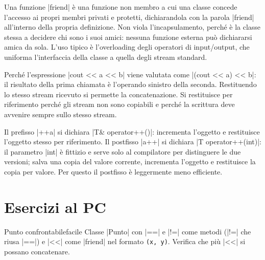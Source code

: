 \begin{orale}
Una funzione \cc|friend| è una funzione non membro a cui una classe concede l'accesso ai
propri membri privati e protetti, dichiarandola con la parola \cc|friend| all'interno
della propria definizione. Non viola l'incapsulamento, perché è la classe stessa a
decidere chi sono i suoi amici: nessuna funzione esterna può dichiararsi amica da sola.
L'uso tipico è l'overloading degli operatori di input/output, che uniforma l'interfaccia
della classe a quella degli stream standard.
\end{orale}

\begin{orale}
Perché l'espressione \cc|cout << a << b| viene valutata come \cc|(cout << a) << b|: il
risultato della prima chiamata è l'operando sinistro della seconda. Restituendo lo stesso
stream ricevuto si permette la concatenazione. Si restituisce per riferimento perché gli
stream non sono copiabili e perché la scrittura deve avvenire sempre sullo stesso stream.
\end{orale}

\begin{orale}
Il prefisso \cc|++a| si dichiara \cc|T& operator++()|: incrementa l'oggetto e restituisce
l'oggetto stesso per riferimento. Il postfisso \cc|a++| si dichiara
\cc|T operator++(int)|: il parametro \cc|int| è fittizio e serve solo al compilatore per
distinguere le due versioni; salva una copia del valore corrente, incrementa l'oggetto e
restituisce la copia per valore. Per questo il postfisso è leggermente meno efficiente.
\end{orale}

\section{Esercizi al PC}

\begin{esercizio}{Punto confrontabile}{facile}
Classe \cc|Punto| con \cc|==| e \cc|!=| come metodi (\cc|!=| che riusa \cc|==|) e
\cc|<<| come \cc|friend| nel formato \texttt{(x, y)}. Verifica che più \cc|<<| si possano
concatenare.
\end{esercizio}

